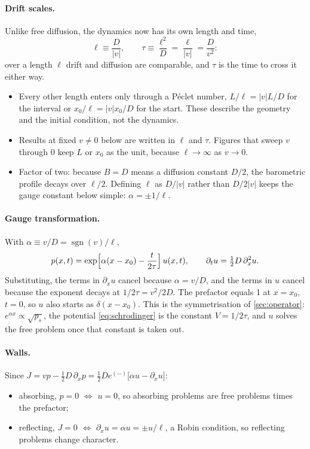 \documentclass[11pt]{article}
\numberwithin{equation}{section}
\begin{document}
\paragraph{Drift scales.} Unlike free diffusion, the dynamics now has its own length and time,
\begin{equation}
  \ell\equiv\frac{D}{|v|},\qquad \tau\equiv\frac{\ell^2}{D}=\frac{\ell}{|v|}=\frac{D}{v^2}:
  \label{eq:drift-scales}
\end{equation}
over a length $\ell$ drift and diffusion are comparable, and $\tau$ is the time to cross it either way.
\begin{itemize}
  \item Every other length enters only through a P\'eclet number, $L/\ell=|v|L/D$ for the interval or
        $x_0/\ell=|v|x_0/D$ for the start. These describe the geometry and the initial condition, not the dynamics.
  \item Results at fixed $v\neq0$ below are written in $\ell$ and $\tau$. Figures that sweep $v$ through $0$
        keep $L$ or $x_0$ as the unit, because $\ell\to\infty$ as $v\to0$.
  \item Factor of two: because $B=D$ means a diffusion constant $D/2$, the barometric profile decays over
        $\ell/2$. Defining $\ell$ as $D/|v|$ rather than $D/2|v|$ keeps the gauge constant below simple:
        $\alpha=\pm1/\ell$.
\end{itemize}

\paragraph{Gauge transformation.} With $\alpha\equiv v/D=\operatorname{sgn}(v)/\ell$,
\begin{equation}
  p(x,t)=\exp\Bigl[\alpha(x-x_0)-\frac{t}{2\tau}\Bigr]\,u(x,t),\qquad \partial_tu=\tfrac12D\,\partial_x^2u .
  \label{eq:gauge}
\end{equation}
Substituting, the terms in $\partial_xu$ cancel because $\alpha=v/D$, and the terms in $u$ cancel because the
exponent decays at $1/2\tau=v^2/2D$. The prefactor equals 1 at $x=x_0$, $t=0$, so $u$ also starts as
$\delta(x-x_0)$. This is the symmetrisation of \cref{sec:operator}: $e^{\alpha x}\propto\sqrt{p_s}$, the
potential \cref{eq:schrodinger} is the constant $V=1/2\tau$, and $u$ solves the free problem once that constant
is taken out.

\paragraph{Walls.} Since $J=vp-\tfrac12D\,\partial_xp=\tfrac12De^{(\cdots)}\bigl[\alpha u-\partial_xu\bigr]$:
\begin{itemize}
  \item absorbing, $p=0$ $\iff$ $u=0$, so absorbing problems are free problems times the prefactor;
  \item reflecting, $J=0$ $\iff$ $\partial_xu=\alpha u=\pm u/\ell$, a Robin condition, so reflecting problems
        change character.
\end{itemize}
\end{document}
